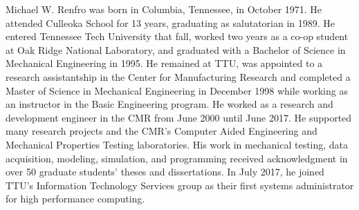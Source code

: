 

Michael W. Renfro was born in Columbia, Tennessee, in October 1971.
He attended Culleoka School for 13 years, graduating as salutatorian in 1989.
He entered Tennessee Tech University that fall, worked two years as a co-op student at Oak Ridge National Laboratory, and graduated with a Bachelor of Science in Mechanical Engineering in 1995.
He remained at TTU, was appointed to a research assistantship in the Center for Manufacturing Research and completed a Master of Science in Mechanical Engineering in December 1998 while working as an instructor in the Basic Engineering program.
He worked as a research and development engineer in the CMR from June 2000 until June 2017.
He supported many research projects and the CMR's Computer Aided Engineering and Mechanical Properties Testing laboratories.
His work in mechanical testing, data acquisition, modeling, simulation, and programming received acknowledgment in over 50 graduate students' theses and dissertations.
In July 2017, he joined TTU's Information Technology Services group as their first systems administrator for high performance computing.